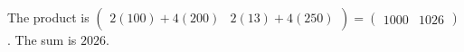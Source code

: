 The product is $\begin{pmatrix}2(100)+4(200)&2(13)+4(250)\end{pmatrix}=\begin{pmatrix}1000&1026\end{pmatrix}$. The sum is $\boxed{2026}$.
